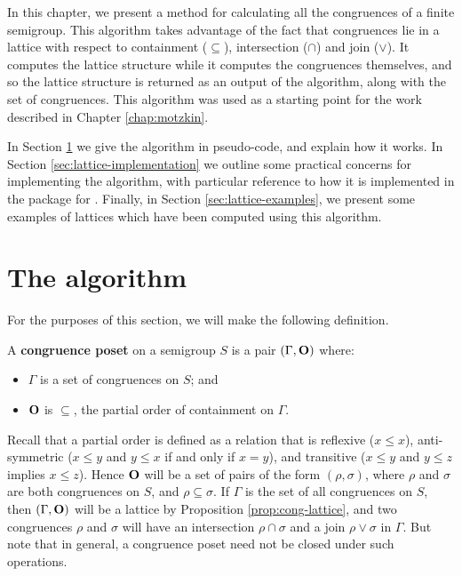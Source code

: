 In this chapter, we present a method for calculating all the congruences of a
finite semigroup.  This algorithm takes advantage of the fact that congruences
lie in a lattice with respect to containment ($\subseteq$), intersection
($\cap$) and join ($\vee$).  It computes the lattice structure while it computes
the congruences themselves, and so the lattice structure is returned as an
output of the algorithm, along with the set of congruences.  This algorithm was
used as a starting point for the work described in Chapter \ref{chap:motzkin}.

In Section \ref{sec:lattice-algorithm} we give the algorithm in pseudo-code, and
explain how it works.  In Section \ref{sec:lattice-implementation} we outline
some practical concerns for implementing the algorithm, with particular
reference to how it is implemented in the \Semigroups{} package \cite{semigroups}
for \GAP{} \cite{gap}.  Finally, in Section \ref{sec:lattice-examples}, we
present some examples of lattices which have been computed using this algorithm.

\section{The algorithm}
\label{sec:lattice-algorithm}

For the purposes of this section, we will make the following definition.

\begin{definition}
  \label{def:congruence-poset}
  A \textbf{congruence poset} on a semigroup $S$ is a pair $(\Gamma, \mathbf{O})$
  where:
  \begin{itemize}
  \item $\Gamma$ is a set of congruences on $S$; and
  \item $\mathbf{O}$ is $\subseteq$, the partial order of containment on $\Gamma$.
  \end{itemize}
\end{definition}

Recall that a partial order is defined as a relation that is reflexive
($x \leq x$), anti-symmetric ($x \leq y$ and $y \leq x$ if and only if $x = y$),
and transitive ($x \leq y$ and $y \leq z$ implies $x \leq z$).
Hence $\mathbf{O}$ will be a set of pairs of the form $(\rho, \sigma)$, where $\rho$
and $\sigma$ are both congruences on $S$, and $\rho \subseteq \sigma$.  If
$\Gamma$ is the set of all congruences on $S$, then $(\Gamma, \mathbf{O})$ will be a
lattice by Proposition \ref{prop:cong-lattice}, and two congruences $\rho$ and
$\sigma$ will have an intersection $\rho \cap \sigma$ and a join
$\rho \vee \sigma$ in $\Gamma$.  But note that in general, a congruence poset
need not be closed under such operations.

